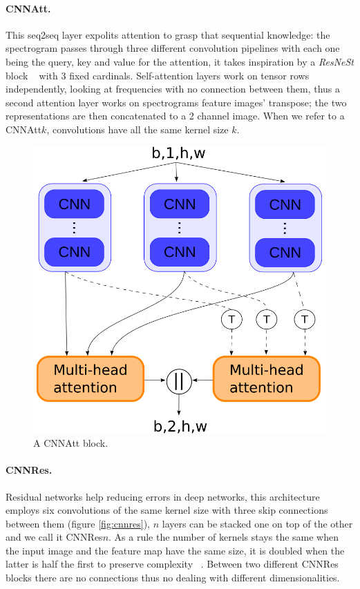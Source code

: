 \documentclass{article}
\begin{document}
\paragraph*{CNNAtt.}
This seq2seq layer expolits attention to grasp that sequential knowledge: the spectrogram passes through three different convolution pipelines with each one being the query, key and value for the attention, it takes inspiration by a \textit{ResNeSt} block ~\cite{zhang2020resnest} with 3 fixed cardinals. 
Self-attention layers  work on tensor rows independently, looking at frequencies with no connection between them, thus a second attention layer works on spectrograms feature images' transpose; the two representations are then concatenated to a 2 channel image.
When we refer to a CNNAtt$k$, convolutions have all the same kernel size $k$.

\begin{figure}
    \centering
    \includegraphics[scale=.3]{images/cnn_att.png}
    \caption{A CNNAtt block.}
    \label{fig:cnnatt}
\end{figure}

\paragraph*{CNNRes.}
Residual networks help reducing errors in deep networks, this architecture employs six convolutions of the same kernel size with three skip connections between them (figure \ref{fig:cnnres}), $n$ layers can be stacked one on top of the other and we call it CNNRes$n$.
As a rule the number of kernels stays the same when the input image and the feature map have the same size, it is doubled when the latter is half the first to preserve complexity ~\cite{he2016deep}.
Between two different CNNRes blocks there are no connections thus no dealing with different dimensionalities. 
\end{document}
